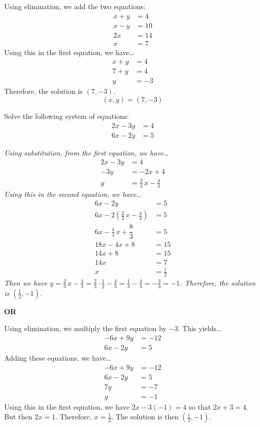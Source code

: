 \documentclass[12pt,letterpaper]{exam}
\begin{document}
\begin{questions}
{Using elimination, we add the two equations:
	\[
	\begin{aligned}
	x + y&= 4 \\
	x - y&= 10 \\ \hline
	2x&= 14 \\
	x&= 7
	\end{aligned}
	\]
Using this in the first equation, we have\dots
	\[
	\begin{aligned}
	x + y&= 4 \\
	7 + y&= 4 \\
	y&= -3
	\end{aligned}
	\]
Therefore, the solution is $(7, -3)$. \pspace
	\[
	\boxed{(x, y)= (7, -3)}
	\]
}





\newpage
\question[5] Solve the following system of equations: 
	\[
	\begin{aligned}
	2x - 3y&= 4 \\
	6x - 2y&= 5
	\end{aligned}
	\] \pspace

{\itshape Using substitution, from the first equation, we have\dots
	\[
	\begin{aligned}
	2x - 3y&= 4 \\
	-3y&= -2x + 4 \\
	y&= \frac{2}{3}\,x - \frac{4}{3}
	\end{aligned}
	\]
Using this in the second equation, we have\dots
	\[
	\begin{aligned}
	6x - 2y&= 5 \\
	6x - 2 \left( \frac{2}{3}\,x - \frac{4}{3} \right)&= 5 \\
	6x - \frac{4}{3}\,x + \dfrac{8}{3}&= 5 \\
	18x - 4x + 8&= 15 \\
	14x + 8&= 15 \\
	14x&= 7 \\
	x&= \frac{1}{2}
	\end{aligned}
	\]
Then we have $y= \frac{2}{3}\,x - \frac{4}{3}= \frac{2}{3} \cdot \frac{1}{2} - \frac{4}{3}= \frac{1}{3} - \frac{4}{3}= -\frac{3}{3}= -1$. Therefore, the solution is $(\frac{1}{2}, -1)$. 

	\begin{center} {\bfseries OR} \end{center}

Using elimination, we multiply the first equation by $-3$. This yields\dots
	\[
	\begin{aligned}
	-6x + 9y&= -12 \\
	6x - 2y&= 5
	\end{aligned}
	\]
Adding these equations, we have\dots
	\[
	\begin{aligned}
	-6x + 9y&= -12 \\
	6x - 2y&= 5 \\ \hline
	7y&= -7 \\
	y&= -1
	\end{aligned}
	\]
Using this in the first equation, we have $2x - 3(-1)= 4$ so that $2x + 3= 4$. But then $2x= 1$. Therefore, $x= \frac{1}{2}$. The solution is then $(\frac{1}{2}, -1)$. \pspace

}
\end{questions}
\end{document}
